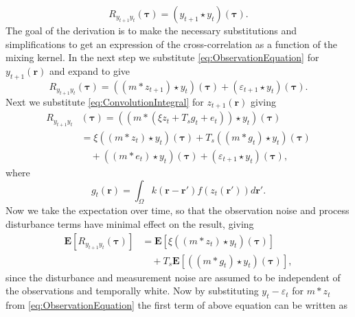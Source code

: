 \documentclass[10pt,twocolumn,twoside]{IEEEtran}
\begin{document}
\begin{equation}
	R_{y_{t+1}y_t}(\boldsymbol{\tau}) = \left(y_{t+1}\star y_t\right)\left(\boldsymbol{\tau}\right).
\end{equation}
The goal of the derivation is to make the necessary substitutions and simplifications to get an expression of the cross-correlation as a function of the mixing kernel.
In the next step we substitute \eqref{eq:ObservationEquation} for $y_{t+1}(\mathbf{r})$ and expand to give
\begin{equation}
	R_{y_{t+1}y_t}\left(\boldsymbol{\tau}\right) = \left(\left(m \ast z_{t+1}\right)\star y_t\right)\left(\boldsymbol{\tau}\right) + \left(\varepsilon_{t+1} \star y_t\right)\left(\boldsymbol{\tau}\right).
\end{equation}
Next we substitute \eqref{eq:ConvolutionIntegral} for $z_{t+1}(\mathbf{r})$ giving 
\begin{align}
	R_{y_{t+1}y_t}&(\boldsymbol{\tau}) = (\left(m \ast \left(\xi z_t +  T_s g_t + e_t\right)\right) \star y_t)(\boldsymbol{\tau}) \nonumber\\
	&= \xi\left(\left(m \ast z_t\right) \star y_t \right)(\boldsymbol{\tau})+ T_s \left(\left(m\ast g_t\right)\star y_t \right)(\boldsymbol{\tau}) \nonumber\\
	&\quad+ \left(\left(m\ast e_t\right)\star y_t \right)(\boldsymbol{\tau})+ (\varepsilon_{t+1} \star y_t)(\boldsymbol{\tau}),
\end{align}
where
\begin{equation}\label{eq:averagefiringrate}
	g_t(\mathbf r)=\int_{\Omega}k\left(\mathbf{r}-\mathbf{r}'\right)f(z_{t}\left(\mathbf{r}'\right))d\mathbf{r}'.
\end{equation}
Now we take the expectation over time, so that the observation noise and process disturbance terms have minimal effect on the result, giving 
\begin{align}\label{eq:ExpectationToCancelNoise}
	\mathbf{E}[R_{y_{t+1}y_t}(\boldsymbol{\tau})] &= \mathbf{E}[\xi\left(\left(m \ast z_t\right) \star y_t \right)(\boldsymbol{\tau})] \nonumber \\
	 &\quad+ T_s \mathbf{E}[\left(\left(m\ast g_t\right)\star y_t \right)(\boldsymbol{\tau})],
\end{align}
since the disturbance and measurement noise are assumed to be independent of the observations and temporally white.
Now by substituting $y_t - \varepsilon_t$ for $m\ast z_t$ from \eqref{eq:ObservationEquation} the first term of above equation can be written as
\end{document}

